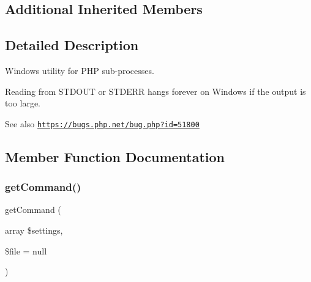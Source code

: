 \subsection*{Additional Inherited Members}


\subsection{Detailed Description}
Windows utility for P\+HP sub-\/processes.

Reading from S\+T\+D\+O\+UT or S\+T\+D\+E\+RR hangs forever on Windows if the output is too large.

\begin{DoxySeeAlso}{See also}
\href{https://bugs.php.net/bug.php?id=51800}{\tt https\+://bugs.\+php.\+net/bug.\+php?id=51800} 
\end{DoxySeeAlso}


\subsection{Member Function Documentation}
\mbox{\label{class_p_h_p_unit___util___p_h_p___windows_a2c4a30cba6979f1463dfe4dc50d7bd9f}} 
\subsubsection{\texorpdfstring{get\+Command()}{getCommand()}}
{\footnotesize\ttfamily get\+Command (\begin{DoxyParamCaption}\item[{array}]{\$settings,  }\item[{}]{\$file = {\ttfamily null} }\end{DoxyParamCaption})}

\mbox{\label{class_p_h_p_unit___util___p_h_p___windows_ae5dbd216c09bda4ea76d2ca28e27eb00}} 
